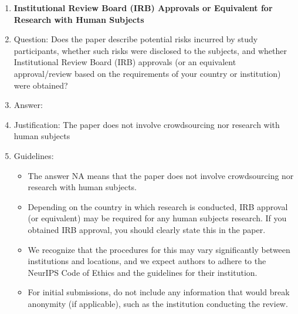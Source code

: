 \documentclass{article}
\theoremstyle{plain}
\theoremstyle{definition}
\theoremstyle{remark}
\theoremstyle{plain}
\begin{document}
\begin{enumerate}
\item {\bf Institutional Review Board (IRB) Approvals or Equivalent for Research with Human Subjects}
    \item[] Question: Does the paper describe potential risks incurred by study participants, whether such risks were disclosed to the subjects, and whether Institutional Review Board (IRB) approvals (or an equivalent approval/review based on the requirements of your country or institution) were obtained?
    \item[] Answer: \answerNA{} %
    \item[] Justification: The paper does not involve crowdsourcing nor research with human subjects
    \item[] Guidelines:
    \begin{itemize}
        \item The answer NA means that the paper does not involve crowdsourcing nor research with human subjects.
        \item Depending on the country in which research is conducted, IRB approval (or equivalent) may be required for any human subjects research. If you obtained IRB approval, you should clearly state this in the paper. 
        \item We recognize that the procedures for this may vary significantly between institutions and locations, and we expect authors to adhere to the NeurIPS Code of Ethics and the guidelines for their institution. 
        \item For initial submissions, do not include any information that would break anonymity (if applicable), such as the institution conducting the review.
    \end{itemize}
\end{enumerate}
\end{document}
